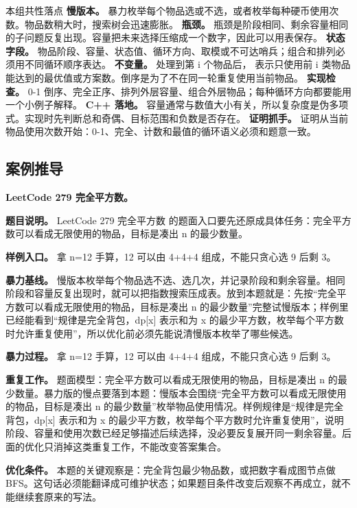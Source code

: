 \begin{principlebox}{本组共性落点}
\textbf{慢版本。} 暴力枚举每个物品选或不选，或者枚举每种硬币使用次数。物品数稍大时，搜索树会迅速膨胀。
\textbf{瓶颈。} 瓶颈是阶段相同、剩余容量相同的子问题反复出现。容量把未来选择压缩成一个数字，因此可以用表保存。
\textbf{状态字段。} 物品阶段、容量、状态值、循环方向、取模或不可达哨兵；组合和排列必须用不同循环顺序表达。
\textbf{不变量。} 处理到第 i 个物品后， 表示只使用前 i 类物品能达到的最优值或方案数。倒序是为了不在同一轮重复使用当前物品。
\textbf{实现检查。} 0-1 倒序、完全正序、排列外层容量、组合外层物品；每种循环方向都要能用一个小例子解释。
\textbf{C++ 落地。} 容量通常与数值大小有关，所以复杂度是伪多项式。实现时先判断总和奇偶、目标范围和负数是否存在。
\textbf{证明抓手。} 证明从当前物品使用次数开始：0-1、完全、计数和最值的循环语义必须和题意一致。
\end{principlebox}

\subsection{案例推导}

\noindent\textbf{LeetCode 279 完全平方数。}

\textbf{题目说明。} LeetCode 279 完全平方数 的题面入口要先还原成具体任务：完全平方数可以看成无限使用的物品，目标是凑出 n 的最少数量。

\textbf{样例入口。} 拿 n=12 手算，12 可以由 4+4+4 组成，不能只贪心选 9 后剩 3。

\textbf{暴力基线。} 慢版本枚举每个物品选不选、选几次，并记录阶段和剩余容量。相同阶段和容量反复出现时，就可以把指数搜索压成表。放到本题就是：先按“完全平方数可以看成无限使用的物品，目标是凑出 n 的最少数量”完整试慢版本；样例里已经能看到“规律是完全背包，dp[x] 表示和为 x 的最少平方数，枚举每个平方数时允许重复使用”，所以优化前必须先能说清慢版本枚举了哪些候选。

\textbf{暴力过程。} 拿 n=12 手算，12 可以由 4+4+4 组成，不能只贪心选 9 后剩 3。

\textbf{重复工作。} 题面模型：完全平方数可以看成无限使用的物品，目标是凑出 n 的最少数量。暴力版的慢点要落到本题：慢版本会围绕“完全平方数可以看成无限使用的物品，目标是凑出 n 的最少数量”枚举物品使用情况。样例规律是“规律是完全背包，dp[x] 表示和为 x 的最少平方数，枚举每个平方数时允许重复使用”，说明阶段、容量和使用次数已经足够描述后续选择，没必要反复展开同一剩余容量。后面的优化只消掉这类重复工作，不能改变答案集合。

\textbf{优化条件。} 本题的关键观察是：完全背包最少物品数，或把数字看成图节点做 BFS。这句话必须能翻译成可维护状态；如果题目条件改变后观察不再成立，就不能继续套原来的写法。

